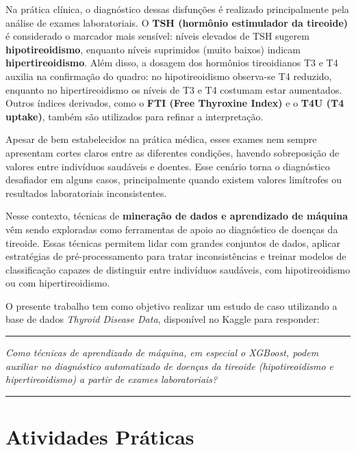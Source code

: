 \documentclass[11pt]{article}
\newcommand{\HRule}[1]{\rule{\linewidth}{#1}}
\begin{document}
Na prática clínica, o diagnóstico dessas disfunções é realizado principalmente pela análise de exames laboratoriais. O \textbf{TSH (hormônio estimulador da tireoide)} é considerado o marcador mais sensível: níveis elevados de TSH sugerem \textbf{hipotireoidismo}, enquanto níveis suprimidos (muito baixos) indicam \textbf{hipertireoidismo}. Além disso, a dosagem dos hormônios tireoidianos T3 e T4 auxilia na confirmação do quadro: no hipotireoidismo observa-se T4 reduzido, enquanto no hipertireoidismo os níveis de T3 e T4 costumam estar aumentados. Outros índices derivados, como o \textbf{FTI (Free Thyroxine Index)} e o \textbf{T4U (T4 uptake)}, também são utilizados para refinar a interpretação.  

Apesar de bem estabelecidos na prática médica, esses exames nem sempre apresentam cortes claros entre as diferentes condições, havendo sobreposição de valores entre indivíduos saudáveis e doentes. Esse cenário torna o diagnóstico desafiador em alguns casos, principalmente quando existem valores limítrofes ou resultados laboratoriais inconsistentes.  

Nesse contexto, técnicas de \textbf{mineração de dados e aprendizado de máquina} vêm sendo exploradas como ferramentas de apoio ao diagnóstico de doenças da tireoide. Essas técnicas permitem lidar com grandes conjuntos de dados, aplicar estratégias de pré-processamento para tratar inconsistências e treinar modelos de classificação capazes de distinguir entre indivíduos saudáveis, com hipotireoidismo ou com hipertireoidismo.  

O presente trabalho tem como objetivo realizar um estudo de caso utilizando a base de dados \textit{Thyroid Disease Data}, disponível no Kaggle \cite{thyroid-dataset} para responder:


\par\noindent\rule{\textwidth}{0.4pt}
\begin{center}
    \textit{Como técnicas de aprendizado de máquina, em especial o XGBoost, podem auxiliar no diagnóstico automatizado de doenças da tireoide (hipotireoidismo e hipertireoidismo) a partir de exames laboratoriais?}
\end{center}
\par\noindent\rule{\textwidth}{0.4pt}

 
\section{Atividades Práticas}
\end{document}
